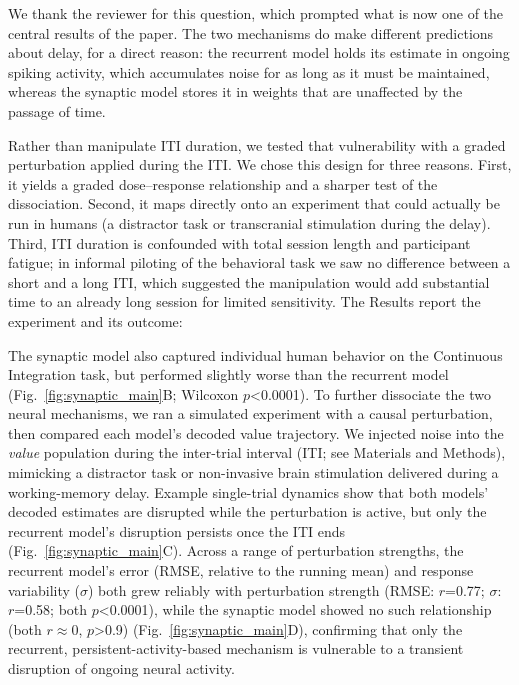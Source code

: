We thank the reviewer for this question, which prompted what is now one of the central results of the paper. The two mechanisms do make different predictions about delay, for a direct reason: the recurrent model holds its estimate in ongoing spiking activity, which accumulates noise for as long as it must be maintained, whereas the synaptic model stores it in weights that are unaffected by the passage of time.

Rather than manipulate ITI duration, we tested that vulnerability with a graded perturbation applied during the ITI. We chose this design for three reasons. First, it yields a graded dose--response relationship and a sharper test of the dissociation. Second, it maps directly onto an experiment that could actually be run in humans (a distractor task or transcranial stimulation during the delay). Third, ITI duration is confounded with total session length and participant fatigue; in informal piloting of the behavioral task we saw no difference between a short and a long ITI, which suggested the manipulation would add substantial time to an already long session for limited sensitivity. The Results report the experiment and its outcome:

\begin{ms}
The synaptic model also captured individual human behavior on the Continuous Integration task, but performed slightly worse than the recurrent model (Fig.~\ref{fig:synaptic_main}B; Wilcoxon $p$<0.0001). To further dissociate the two neural mechanisms, we ran a simulated experiment with a causal perturbation, then compared each model's decoded value trajectory. We injected noise into the \textit{value} population during the inter-trial interval (ITI; see Materials and Methods), mimicking a distractor task or non-invasive brain stimulation delivered during a working-memory delay. Example single-trial dynamics show that both models' decoded estimates are disrupted while the perturbation is active, but only the recurrent model's disruption persists once the ITI ends (Fig.~\ref{fig:synaptic_main}C). Across a range of perturbation strengths, the recurrent model's error (RMSE, relative to the running mean) and response variability ($\sigma$) both grew reliably with perturbation strength (RMSE: $r$=0.77; $\sigma$: $r$=0.58; both $p$<0.0001), while the synaptic model showed no such relationship (both $r\approx0$, $p$>0.9) (Fig.~\ref{fig:synaptic_main}D), confirming that only the recurrent, persistent-activity-based mechanism is vulnerable to a transient disruption of ongoing neural activity.
\end{ms}

